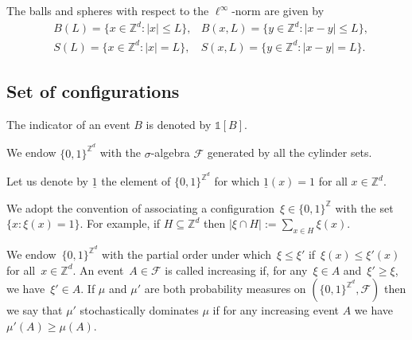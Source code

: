 \documentclass[a4paper,12pt]{article}
\newcommand{\Z}{\mathbb{Z}}
\begin{document}
The balls and spheres with respect to the $\ell^\infty$-norm are given by
\begin{align}
\label{ball_def}
&B(L) = \{x \in \Z^d: |x| \leq L\}, &B(x,L) = \{y \in \Z^d: |x-y| \leq L\},\\
\label{sphere_def}
&S(L) = \{x \in \Z^d: |x|= L\}, &S(x,L) = \{y \in \Z^d: |x-y|= L\}.
\end{align}




\subsection{Set of configurations }
\label{subsetion_set_of_config}

The indicator of an event  $B$ is denoted by $\mathds{1}[B]$.

\smallskip


We endow $\{0,1\}^{\Z^d}$ with the $\sigma$-algebra $\mathcal{F}$ generated by all the cylinder sets.

\smallskip

Let us denote by $\underline{1}$ the element of $\{0,1\}^{\Z^d}$ for which $\underline{1}(x)=1$ for all $x \in \mathbb{Z}^d$.

\smallskip

We adopt the convention of associating a configuration~$\xi \in \{0,1\}^\Z$ with the set~$\{x: \xi(x)=1\}$. For example, if
$H \subseteq \mathbb{Z}^d$ then $|\xi \cap H |:=\sum_{x \in H} \xi(x)$.

We endow~$\{0,1\}^{\Z^d}$ with the partial order under which~$\xi \leq \xi'$ if~$\xi(x) \leq \xi'(x)$ for all~$x \in \mathbb{Z}^d$. An event~$A \in \mathcal{F}$ is called increasing if, for any~$\xi \in A$ and~$\xi' \geq \xi$, we have~$\xi' \in A$. If $\mu$ and $\mu'$ are both probability measures on $(\{0,1\}^{\Z^d},\mathcal{F})$ then we
say that $\mu'$ stochastically dominates $\mu$ if for any increasing event $A$ we have $\mu'(A)\geq \mu(A)$.
\end{document}
